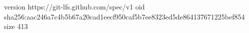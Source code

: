 version https://git-lfs.github.com/spec/v1
oid sha256:aac246a7c4b5b67a20cad1eecf950caf5b7ee8323ed5de864137671225bef854
size 413
